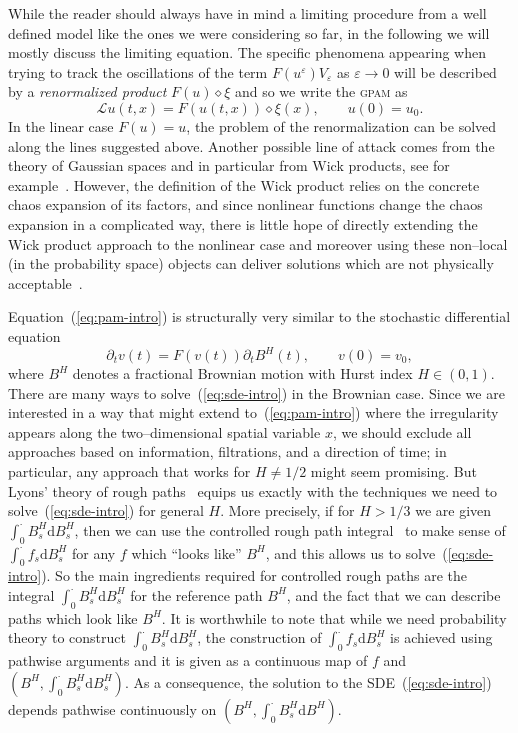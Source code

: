 \documentclass[a4paper,11pt]{article}
\newcommand{\mathd}{\mathrm{d}}
\newcommand{\tmem}[1]{{\em #1\/}}
\newcommand{\tmname}[1]{\textsc{#1}}
\newcommand{\LL}{\mathscr{L}}
\newcommand{\renorm}{\,\mathord{\diamond}\,}
\begin{document}
While the reader should always have in mind a limiting procedure from a well
defined model like the ones we were considering so far, in the following we
will mostly discuss the limiting equation. The specific phenomena appearing
when trying to track the oscillations of the term $F (u^{\varepsilon})
V_{\varepsilon}$ as $\varepsilon \rightarrow 0$ will be described by a
{\tmem{renormalized product}} $F (u) \renorm \xi$ and so we write the
{\tmname{gpam}} as
\begin{equation}
  \label{eq:pam-intro} \LL u (t, x) = F (u (t, x)) \renorm \xi (x),
  \hspace{2em} u (0) = u_0 .
\end{equation}
In the linear case $F (u) = u$, the problem of the renormalization can be
solved along the lines suggested above. Another possible line of attack comes
from the theory of Gaussian spaces and in particular from Wick products, see
for example~{\cite{Hu2002}}. However, the definition of the Wick product
relies on the concrete chaos expansion of its factors, and since nonlinear
functions change the chaos expansion in a complicated way, there is little
hope of directly extending the Wick product approach to the nonlinear case and
moreover using these non--local (in the probability space) objects can deliver
solutions which are not physically acceptable~{\cite{Chan2000}}.

Equation~(\ref{eq:pam-intro}) is structurally very similar to the stochastic
differential equation
\begin{equation}
  \label{eq:sde-intro} \partial_t v (t) = F (v (t)) \partial_t B^H (t),
  \hspace{2em} v (0) = v_0,
\end{equation}
where $B^H$ denotes a fractional Brownian motion with Hurst index $H \in (0,
1)$. There are many ways to solve~(\ref{eq:sde-intro}) in the Brownian case.
Since we are interested in a way that might extend to~(\ref{eq:pam-intro})
where the irregularity appears along the two--dimensional spatial variable
$x$, we should exclude all approaches based on information, filtrations, and a
direction of time; in particular, any approach that works for $H \neq 1 / 2$
might seem promising. But Lyons' theory of rough paths~{\cite{Lyons1998}}
equips us exactly with the techniques we need to solve~(\ref{eq:sde-intro})
for general $H$. More precisely, if for $H > 1 / 3$ we are given
$\int_0^{\cdot} B^H_s \mathd B_s^H$, then we can use the controlled rough path
integral~{\cite{Gubinelli2004}} to make sense of $\int_0^{\cdot} f_s \mathd
B^H_s$ for any $f$ which ``looks like'' $B^H$, and this allows us to
solve~(\ref{eq:sde-intro}). So the main ingredients required for controlled
rough paths are the integral $\int_0^{\cdot} B^H_s \mathd B_s^H$ for the
reference path $B^H$, and the fact that we can describe paths which look like
$B^H$. It is worthwhile to note that while we need probability theory to
construct $\int_0^{\cdot} B^H_s \mathd B_s^H$, the construction of
$\int_0^{\cdot} f_s \mathd B^H_s$ is achieved using pathwise arguments and it
is given as a continuous map of $f$ and $( B^H, \int_0^{\cdot} B^H_s
\mathd B^H_s )$. As a consequence, the solution to the
SDE~(\ref{eq:sde-intro}) depends pathwise continuously on $( B^H,
\int_0^{\cdot} B^H_s \mathd B^H )$.
\end{document}
